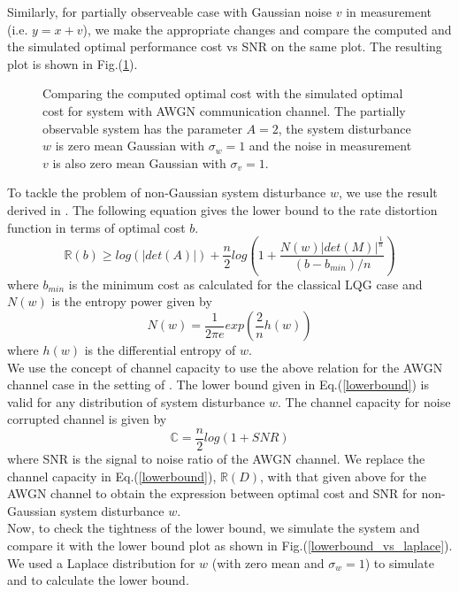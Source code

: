 \documentclass[12pt]{caltech_thesis_progress2}
\begin{document}
Similarly, for partially observeable case with Gaussian noise $v$ in measurement (i.e. $y = x + v$), we make the appropriate changes and compare the computed and the simulated optimal performance cost vs SNR on the same plot. The resulting plot is shown in Fig.(\ref{comp_vs_sim_v}).
	\begin{figure}[H]
			  \centering
			\tiny{	
			}
			  \caption{Comparing the computed optimal cost with the simulated optimal cost for system with AWGN communication channel. The partially observable system has the parameter $A = 2$, the system disturbance $w$ is zero mean Gaussian with $\sigma_{w} = 1$ and the noise in measurement $v$ is also zero mean Gaussian with $\sigma_{v} = 1$.}
			 \label{comp_vs_sim_v}
		\end{figure}	
		To tackle the problem of non-Gaussian system disturbance $w$, we use the result derived in \cite{victoria}. The following equation gives the lower bound to the rate distortion function in terms of optimal cost $b$. 
	\begin{equation}
	\mathbb{R}(b) \geq log(|det(A)|) + \frac{n}{2} log \left( 1 + \frac{N(w)|det(M)|^{\frac{1}{n}}}{(b-b_{min})/n}\right)
	\label{lowerbound}
	\end{equation}	
	where $b_{min}$ is the minimum cost as calculated for the classical LQG case and $N(w)$ is the entropy power given by 
	\begin{equation}
	N(w) = \frac{1}{2 \pi e} exp \left( \frac{2}{n} h(w) \right)
	\end{equation}
	where $h(w)$ is the differential entropy of $w$.\\		
	We use the concept of channel capacity to use the above relation for the AWGN channel case in the setting of \cite{anatoly}. The lower bound given in Eq.(\ref{lowerbound}) is valid for any distribution of system disturbance $w$. The channel capacity for noise corrupted channel is given by
	\begin{equation}
		\mathbb{C} = \frac{n}{2} log\left( 1 + SNR \right)
	\end{equation}
	where SNR is the signal to noise ratio of the AWGN channel. We replace the channel capacity in Eq.(\ref{lowerbound}), $\mathbb{R}(D)$, with that given above for the AWGN channel to obtain the expression between optimal cost and SNR for non-Gaussian system disturbance $w$.
	 \\Now, to check the tightness of the lower bound, we simulate the system and compare it with the lower bound plot as shown in Fig.(\ref{lowerbound_vs_laplace}). We used a Laplace distribution for $w$ (with zero mean and $\sigma_{w} = 1$) to simulate and to calculate the lower bound. 
\end{document}
